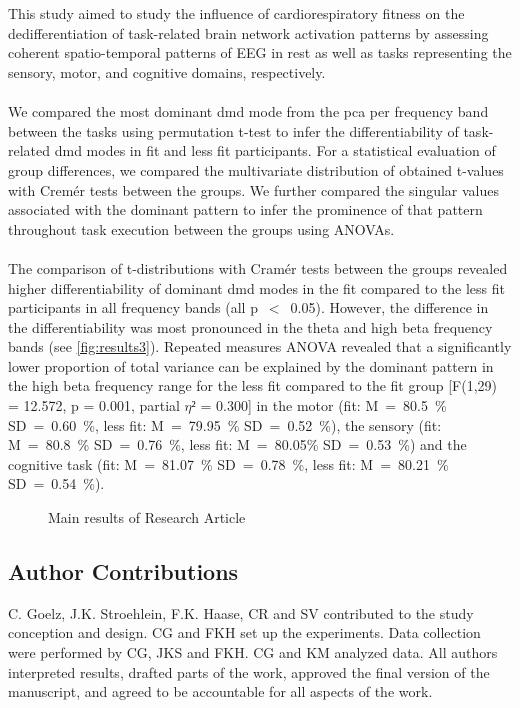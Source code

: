 \\
\\
This study aimed to study the influence of cardiorespiratory fitness on the dedifferentiation of task-related brain network activation patterns by assessing coherent spatio-temporal patterns of EEG in rest as well as tasks representing the sensory, motor, and cognitive domains, respectively.\\
\\
We compared the most dominant \gls{dmd} mode from the \gls{pca} per frequency band between the tasks using permutation t-test to infer the differentiability of task-related \gls{dmd} modes in fit and less fit participants. For a statistical evaluation of group differences, we compared the multivariate distribution of obtained t-values with Cremér tests between the groups. We further compared the singular values associated with the dominant pattern to infer the prominence of that pattern throughout task execution between the groups using ANOVAs.\\
\\
The comparison of t-distributions with Cramér tests between the groups revealed higher differentiability of dominant \gls{dmd} modes in the fit compared to the less fit participants in all frequency bands (all p~$<$~0.05). However, the difference in the differentiability was most pronounced in the theta and high beta frequency bands (see \autoref{fig:results3}). Repeated measures ANOVA revealed that a significantly lower proportion of total variance can be explained by the dominant pattern in the high beta frequency range for the less fit compared to the fit group [F(1,29) = 12.572, p = 0.001, partial $\eta²$ = 0.300] in the motor (fit: M~=~80.5~\% SD~=~0.60~\%, less fit: M~=~79.95~\% SD~=~0.52~\%), the sensory (fit: M~=~80.8~\% SD~=~0.76~\%, less fit: M~=~80.05\% SD~=~0.53~\%) and the cognitive task (fit: M~=~81.07~\% SD~=~0.78~\%, less fit: M~=~80.21~\% SD~=~0.54~\%).
\begin{figure}[h]
    \centering
    
    \caption[Main results of Research Article ]{Main results of Research Article }
    \label{fig:results3}
\end{figure}

\subsection*{Author Contributions}
C. Goelz, J.K. Stroehlein, F.K. Haase, CR and SV contributed to the study conception and design. CG and FKH set up the experiments. Data collection were performed by CG, JKS and FKH. CG and KM analyzed data. All authors interpreted results, drafted parts of the work, approved the final version of the manuscript, and agreed to be
accountable for all aspects of the work.